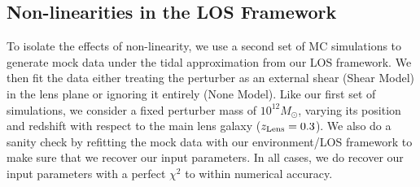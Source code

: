 \subsection{Non-linearities in the LOS Framework}
To isolate the effects of non-linearity, we use a second set of MC simulations to generate mock data under the tidal approximation from our LOS framework. We then fit the data either treating the perturber as an external shear (Shear Model) in the lens plane or ignoring it entirely (None Model). Like our first set of simulations, we consider a fixed perturber mass of $10^{12} M_\odot$, varying its position and redshift with respect to the main lens galaxy ($z_{\rm{Lens}} = 0.3$). We also do a sanity check by refitting the mock data with our environment/LOS framework to make sure that we recover our input parameters. In all cases, we do recover our input parameters with a perfect $\chi^2$ to within numerical accuracy.